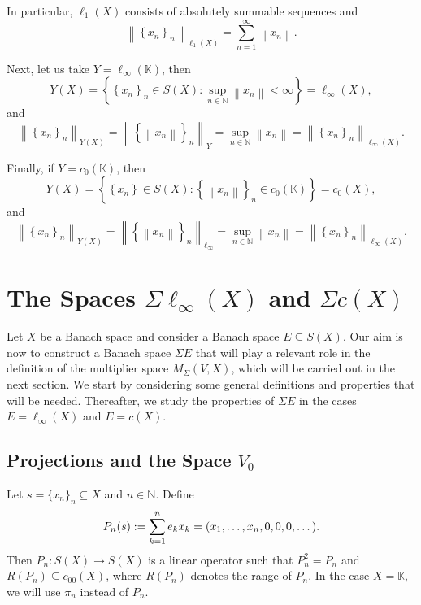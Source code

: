 \documentclass[14pt, a4paper]{article}  %
\providecommand{\llave}[1]{\left\lbrace #1\right\rbrace }
\providecommand{\pare}[1]{\left( #1\right) }
\providecommand{\norm}[1]{\left\lVert#1\right\rVert}
\providecommand{\Sum}[1]{\displaystyle\sum#1}
\newcommand{\K}{\mathbb{K}}
\newcommand{\N}{\mathbb{N}}
\begin{document}
	In particular, $\ell_1(X)$ consists of absolutely summable sequences and
	\begin{equation}
		\norm{\llave{x_n}_n}_{\ell_1(X)}=\sum_{n=1}^{\infty}\norm{x_n}.
	\end{equation}
	
	Next, let us take  $Y=\ell_\infty(\K)$, then
	\begin{equation}
		Y(X)=\llave{\llave{x_n}_n\in S(X):\sup_{n\in\N}\norm{x_n}<\infty}
		=\ell_\infty(X),
	\end{equation}
	and
	\begin{equation}
		\norm{\llave{x_n}_n}_{Y(X)}
		=\norm{\llave{\norm{x_n}}_n}_{Y}
		=\sup_{n\in\N}\norm{x_n}
		=\norm{\llave{x_n}_n}_{\ell_\infty(X)} .
	\end{equation}
	
	Finally, if $Y=c_0(\K)$, then
	\begin{equation}
		Y(X)=\llave{\llave{x_n}\in S(X):\llave{\norm{x_n}}_n\in c_0(\K)}
		=c_0(X),
	\end{equation}
	and
	\begin{equation}
		\norm{\llave{x_n}_n}_{Y(X)}
		=\norm{\llave{\norm{x_n}}_n}_{\ell_\infty}
		=\sup_{n\in\N}\norm{x_n}
		=\norm{\llave{x_n}_n}_{\ell_\infty(X)} .
	\end{equation}
	

	
	\section{The Spaces $\Sigma \ell_{\infty}(X)$ and $\Sigma c(X)$}\label{sec9}\label{pop9}
	
	Let $X$ be a Banach space and consider a Banach space $E \subseteq S(X)$. Our aim is now to construct a Banach space $\Sigma E$ that will play a relevant role in the definition of the multiplier space $M_{\Sigma}\pare{V,X}$, which will be carried out in the next section.    We start  by considering some general definitions and properties that will be needed. Thereafter, we study the properties of $\Sigma E$ in the cases $E=\ell_{\infty}\pare{X}$ and $E=c\pare{X}$.  
	
	
	
	\subsection{Projections and  the Space $V_{0}$}
	 Let $s=\{x_{n}\}_{n}\subseteq X$ and $n\in \N$. Define
	\begin{equation}\label{d126}
		P_{n}(s): = \Sum_{k=1}^{n}e_{k}x_{k}= (x_{1}, \dots, x_{n}, 0, 0, 0, \dots).
	\end{equation}  Then  $P_{n}: S(X) \to S(X)$ is a linear operator such that $P_{n}^{2} = P_{n}$ and $R(P_{n}) \subseteq c_{00}(X)$, where $R(P_{n})$ denotes the range of $P_{n}$. In the case $X = \K$, we will use $\pi_{n}$ instead of $P_{n}$.
	
\end{document}
